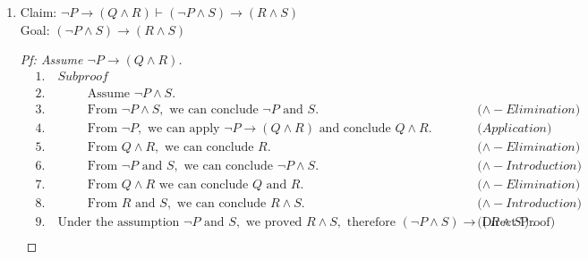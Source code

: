 \documentclass{article}
\begin{document}
\begin{enumerate}
\begin{enumerate}
        \item
        Claim: $\neg P \rightarrow (Q \land R) \vdash (\neg P \land S) \rightarrow (R \land S)$ \\
        Goal: $(\neg P \land S) \rightarrow (R \land S)$
        \begin{proof}[Pf: Assume $\neg P \rightarrow (Q \land R)$]
            \begin{align*}
                &1. \quad Subproof \\
                &2. \quad \hspace{1cm} \text{Assume } \neg P \land S. \\
                &3. \quad \hspace{1cm} \text{From } \neg P \land S, \text{ we can conclude } \neg P \text{ and } S. && \text{($\land - Elimination$)} \\
                &4. \quad \hspace{1cm} \text{From } \neg P, \text{ we can apply } \neg P \rightarrow (Q \land R) \text{ and conclude } Q \land R. && \text{($Application$)} \\
                &5. \quad \hspace{1cm} \text{From } Q \land R, \text{ we can conclude } R. && \text{($\land - Elimination$)} \\
                &6. \quad \hspace{1cm} \text{From } \neg P \text{ and } S, \text{ we can conclude } \neg P \land S. && \text{($\land - Introduction$)} \\
                &7. \quad \hspace{1cm} \text{From } Q \land R \text{ we can conclude } Q \text{ and } R. && \text{($\land - Elimination$)} \\
                &8. \quad \hspace{1cm} \text{From } R \text{ and } S, \text{ we can conclude } R \land S. && \text{($\land - Introduction$)} \\
                &9. \quad \text{Under the assumption } \neg P \text{ and } S, \text{ we proved } R \land S, \text{ therefore } (\neg P \land S) \rightarrow (R \land S). && \text{(Direct Proof)} \\
            \end{align*}
        \end{proof}


\end{enumerate}
\end{enumerate}
\end{document}
